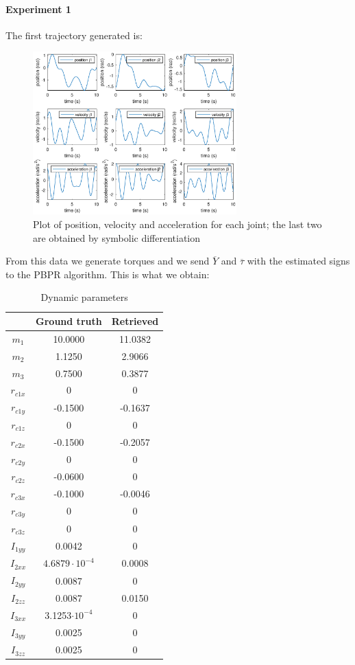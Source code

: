\documentclass{article}
\begin{document}
\paragraph{Experiment 1}
The first trajectory generated is:
\begin{figure}[!htbp]
\centering
\includegraphics[width=0.7\textwidth]{images/3-dof/trajectory123.eps}
\caption{Plot of position, velocity and acceleration for each joint; the last two are obtained by symbolic differentiation}
\end{figure}
\FloatBarrier

From this data we generate torques and we send $\overline{Y}$ and $\overline{\tau}$ with the estimated signs to the PBPR algorithm. This is what we obtain:

\begin{table}[!htbp]
\centering
\begin{tabular}{|c|cc|}
\hline
& Ground truth & Retrieved\\ 
\hline
$m_1$ & 10.0000 & 11.0382\\
$m_2$ & 1.1250 & 2.9066\\
$m_3$ & 0.7500 & 0.3877\\
$r_{c1x}$ &  0 & 0\\
$r_{c1y}$ & -0.1500 & -0.1637\\
$r_{c1z}$ & 0 & 0\\
$r_{c2x}$ & -0.1500 & -0.2057\\
$r_{c2y}$ & 0 & 0\\
$r_{c2z}$ & -0.0600 & 0\\
$r_{c3x}$ & -0.1000 & -0.0046\\
$r_{c3y}$ & 0 & 0\\
$r_{c3z}$ & 0 & 0\\
$I_{1yy}$ & 0.0042 & 0\\
$I_{2xx}$ & $4.6879\cdot 10^{-4}$ & 0.0008\\
$I_{2yy}$ & 0.0087 & 0\\
$I_{2zz}$ & 0.0087 & 0.0150\\
$I_{3xx}$ & 3.1253$\cdot 10^{-4}$ & 0\\
$I_{3yy}$ & 0.0025 & 0\\
$I_{3zz}$ & 0.0025 & 0\\
\hline
\end{tabular}
\caption{Dynamic parameters}
\end{table}
\FloatBarrier
\end{document}
